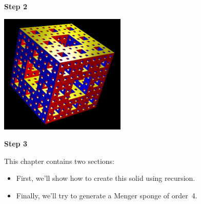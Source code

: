 \begin{center}
\begin{minipage}{6cm}
\begin{center}
 \textbf{Step 2}
\end{center}
\end{minipage}
\begin{minipage}{6cm}
\includegraphics[width=6cm]{pics/menger3.png}
\begin{center}
 \textbf{Step 3}
\end{center}
\end{minipage}
\end{center}
This chapter contains two sections:
\begin{itemize}
 \item First, we'll show how to create this solid using recursion.
 \item Finally, we'll try to generate a Menger sponge of order~4.
\end{itemize}
